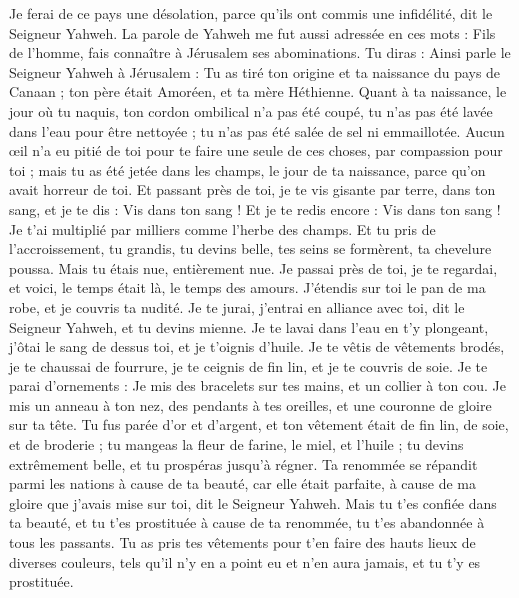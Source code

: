 \begin{multicols}{2}
Je ferai de ce pays une désolation, parce qu'ils ont commis une infidélité, dit le Seigneur Yahweh.
\VerseOne{}La parole de Yahweh me fut aussi adressée en ces mots :
Fils de l’homme, fais connaître à Jérusalem ses abominations.
Tu diras : Ainsi parle le Seigneur Yahweh à Jérusalem : Tu as tiré ton origine et ta naissance du pays de Canaan ; ton père était Amoréen, et ta mère Héthienne.
Quant à ta naissance, le jour où tu naquis, ton cordon ombilical n’a pas été coupé, tu n’as pas été lavée dans l'eau pour être nettoyée ; tu n’as pas été salée de sel ni emmaillotée.
Aucun œil  n’a eu pitié de toi pour te faire une seule de ces choses, par compassion pour toi ; mais tu as été jetée dans les champs, le jour de ta naissance, parce qu'on avait horreur de toi.
Et passant près de toi, je te vis gisante par terre, dans ton sang, et je te dis : Vis dans ton sang ! Et je te redis encore : Vis dans ton sang !
Je t'ai multiplié par milliers comme l'herbe des champs. Et tu pris de l’accroissement, tu grandis, tu devins belle, tes seins se formèrent, ta chevelure poussa. Mais tu étais nue, entièrement nue.
Je passai près de toi, je te regardai, et voici, le temps était là, le temps des amours. J'étendis sur toi le pan de ma robe, et je couvris ta nudité. Je te jurai, j'entrai en alliance avec toi, dit le Seigneur Yahweh, et tu devins mienne.
Je te lavai dans l'eau en t'y plongeant, j'ôtai le sang de dessus toi, et je t'oignis d'huile.
Je te vêtis de vêtements brodés, je te chaussai de fourrure, je te ceignis de fin lin, et je te couvris de soie.
Je te parai d'ornements : Je mis des bracelets sur tes mains, et un collier à ton cou.
Je mis un anneau à ton nez, des pendants à tes oreilles, et une couronne de gloire sur ta tête.
Tu fus parée d'or et d'argent, et ton vêtement était de fin lin, de soie, et de broderie ; tu mangeas la fleur de farine, le miel, et l'huile ; tu devins extrêmement belle, et tu prospéras jusqu’à régner.
Ta renommée se répandit parmi les nations à cause de ta beauté, car elle était parfaite, à cause de ma gloire que j'avais mise sur toi, dit le Seigneur Yahweh.
Mais tu t'es confiée dans ta beauté, et tu t'es prostituée à cause de ta renommée, tu t'es abandonnée à tous les passants.
Tu as pris tes vêtements pour t’en faire des hauts lieux de diverses couleurs, tels qu'il n'y en a point eu et n'en aura jamais, et tu t'y es prostituée.

\end{multicols}
